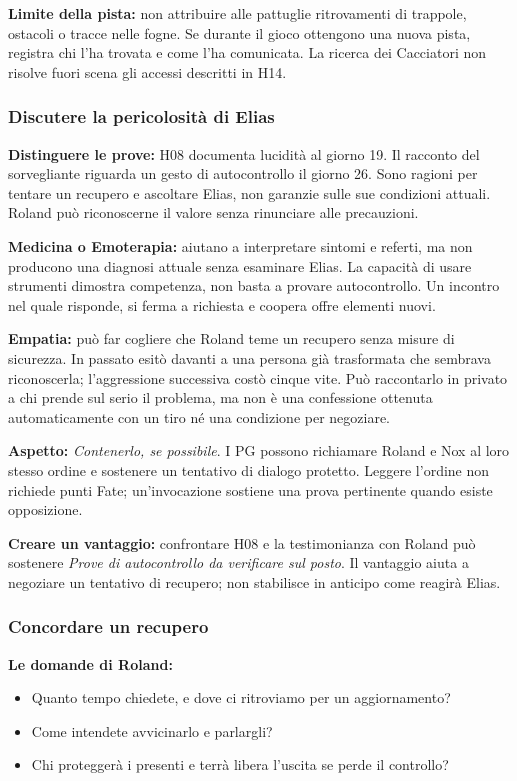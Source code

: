 \documentclass[11pt,a4paper]{article}
\newcommand{\aspect}[1]{\textit{\textcolor{blood}{#1}}}
\begin{document}
\textbf{Limite della pista:} non attribuire alle pattuglie ritrovamenti di trappole, ostacoli o tracce nelle fogne. Se durante il gioco ottengono una nuova pista, registra chi l'ha trovata e come l'ha comunicata. La ricerca dei Cacciatori non risolve fuori scena gli accessi descritti in H14.

\subsubsection{Discutere la pericolosità di Elias}
\textbf{Distinguere le prove:} H08 documenta lucidità al giorno 19. Il racconto del sorvegliante riguarda un gesto di autocontrollo il giorno 26. Sono ragioni per tentare un recupero e ascoltare Elias, non garanzie sulle sue condizioni attuali. Roland può riconoscerne il valore senza rinunciare alle precauzioni.

\textbf{Medicina o Emoterapia:} aiutano a interpretare sintomi e referti, ma non producono una diagnosi attuale senza esaminare Elias. La capacità di usare strumenti dimostra competenza, non basta a provare autocontrollo. Un incontro nel quale risponde, si ferma a richiesta e coopera offre elementi nuovi.

\textbf{Empatia:} può far cogliere che Roland teme un recupero senza misure di sicurezza. In passato esitò davanti a una persona già trasformata che sembrava riconoscerla; l'aggressione successiva costò cinque vite. Può raccontarlo in privato a chi prende sul serio il problema, ma non è una confessione ottenuta automaticamente con un tiro né una condizione per negoziare.

\begin{fatebox}
\textbf{Aspetto:} \aspect{Contenerlo, se possibile}. I PG possono richiamare Roland e Nox al loro stesso ordine e sostenere un tentativo di dialogo protetto. Leggere l'ordine non richiede punti Fate; un'invocazione sostiene una prova pertinente quando esiste opposizione.

\textbf{Creare un vantaggio:} confrontare H08 e la testimonianza con Roland può sostenere \aspect{Prove di autocontrollo da verificare sul posto}. Il vantaggio aiuta a negoziare un tentativo di recupero; non stabilisce in anticipo come reagirà Elias.
\end{fatebox}

\subsubsection{Concordare un recupero}
\textbf{Le domande di Roland:}
\begin{itemize}
\item Quanto tempo chiedete, e dove ci ritroviamo per un aggiornamento?
\item Come intendete avvicinarlo e parlargli?
\item Chi proteggerà i presenti e terrà libera l'uscita se perde il controllo?
\end{itemize}
\end{document}
